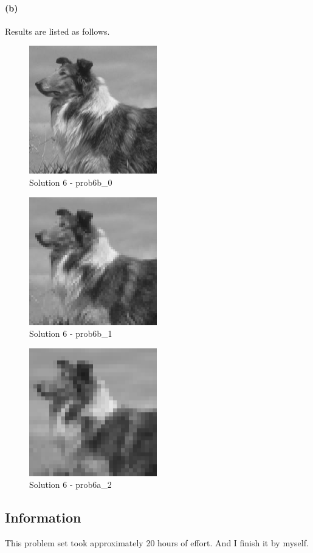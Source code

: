 \documentclass{article}
\newcommand{\info}{\clearpage \subsection*{Information}}
\newcommand{\spart}[1]{\paragraph{(#1)}}
\begin{document}
\spart{b}
Results are listed as follows.
\begin{figure}[!h]
  \centering
  \includegraphics[height=15em]{"code/outputs/prob6b_0.jpg"}
  \caption{Solution 6 - prob6b\_0}
\end{figure}
\begin{figure}[!h]
  \centering
  \includegraphics[height=15em]{"code/outputs/prob6b_1.jpg"}
  \caption{Solution 6 - prob6b\_1}
\end{figure}
\begin{figure}[!h]
  \centering
  \includegraphics[height=15em]{"code/outputs/prob6b_2.jpg"}
  \caption{Solution 6 - prob6a\_2}
\end{figure}
\info

This problem set took approximately 20 hours of effort. And I finish it by myself.
\end{document}

